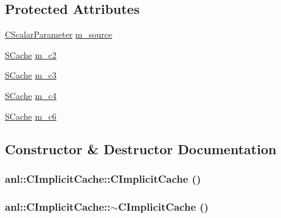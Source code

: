 \subsection*{Protected Attributes}
\begin{DoxyCompactItemize}
\item 
\hyperlink{classanl_1_1CScalarParameter}{CScalarParameter} \hyperlink{classanl_1_1CImplicitCache_ae71fdfc62f638c3ccc085db64dd6979c}{m\_\-source}
\item 
\hyperlink{structanl_1_1SCache}{SCache} \hyperlink{classanl_1_1CImplicitCache_a0c8c06cf8c3e0aea8a639a38f26df439}{m\_\-c2}
\item 
\hyperlink{structanl_1_1SCache}{SCache} \hyperlink{classanl_1_1CImplicitCache_a5618dfde2ed1f77f2ed8639b277787cf}{m\_\-c3}
\item 
\hyperlink{structanl_1_1SCache}{SCache} \hyperlink{classanl_1_1CImplicitCache_a8a5f61b80baf670857dd3551dffd10ea}{m\_\-c4}
\item 
\hyperlink{structanl_1_1SCache}{SCache} \hyperlink{classanl_1_1CImplicitCache_a5c6e78d38a13997a42bfd1e5982be16b}{m\_\-c6}
\end{DoxyCompactItemize}


\subsection{Constructor \& Destructor Documentation}
\hypertarget{classanl_1_1CImplicitCache_a6053baf757980f4a4bd7aafacf928f6e}{
\subsubsection[{CImplicitCache}]{\setlength{\rightskip}{0pt plus 5cm}anl::CImplicitCache::CImplicitCache ()}}
\label{classanl_1_1CImplicitCache_a6053baf757980f4a4bd7aafacf928f6e}
\hypertarget{classanl_1_1CImplicitCache_ad74fc72a3f2bdefa919bfb2bf717273c}{
\subsubsection[{$\sim$CImplicitCache}]{\setlength{\rightskip}{0pt plus 5cm}anl::CImplicitCache::$\sim$CImplicitCache ()}}
\label{classanl_1_1CImplicitCache_ad74fc72a3f2bdefa919bfb2bf717273c}


